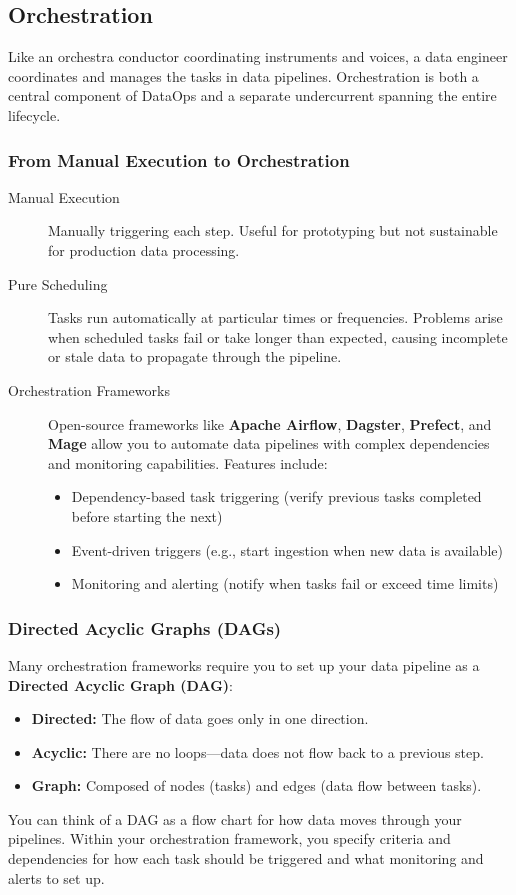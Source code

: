 \documentclass{article}
\begin{document}
\subsection{Orchestration}
Like an orchestra conductor coordinating instruments and voices, a data engineer coordinates and manages the tasks in data pipelines. Orchestration is both a central component of DataOps and a separate undercurrent spanning the entire lifecycle.

\subsubsection{From Manual Execution to Orchestration}
\begin{description}
    \item[Manual Execution] Manually triggering each step. Useful for prototyping but not sustainable for production data processing.
    \item[Pure Scheduling] Tasks run automatically at particular times or frequencies. Problems arise when scheduled tasks fail or take longer than expected, causing incomplete or stale data to propagate through the pipeline.
    \item[Orchestration Frameworks] Open-source frameworks like \textbf{Apache Airflow}, \textbf{Dagster}, \textbf{Prefect}, and \textbf{Mage} allow you to automate data pipelines with complex dependencies and monitoring capabilities. Features include:
    \begin{itemize}
        \item Dependency-based task triggering (verify previous tasks completed before starting the next)
        \item Event-driven triggers (e.g., start ingestion when new data is available)
        \item Monitoring and alerting (notify when tasks fail or exceed time limits)
    \end{itemize}
\end{description}

\subsubsection{Directed Acyclic Graphs (DAGs)}
Many orchestration frameworks require you to set up your data pipeline as a \textbf{Directed Acyclic Graph (DAG)}:
\begin{itemize}
    \item \textbf{Directed:} The flow of data goes only in one direction.
    \item \textbf{Acyclic:} There are no loops---data does not flow back to a previous step.
    \item \textbf{Graph:} Composed of nodes (tasks) and edges (data flow between tasks).
\end{itemize}
You can think of a DAG as a flow chart for how data moves through your pipelines. Within your orchestration framework, you specify criteria and dependencies for how each task should be triggered and what monitoring and alerts to set up.
\end{document}
